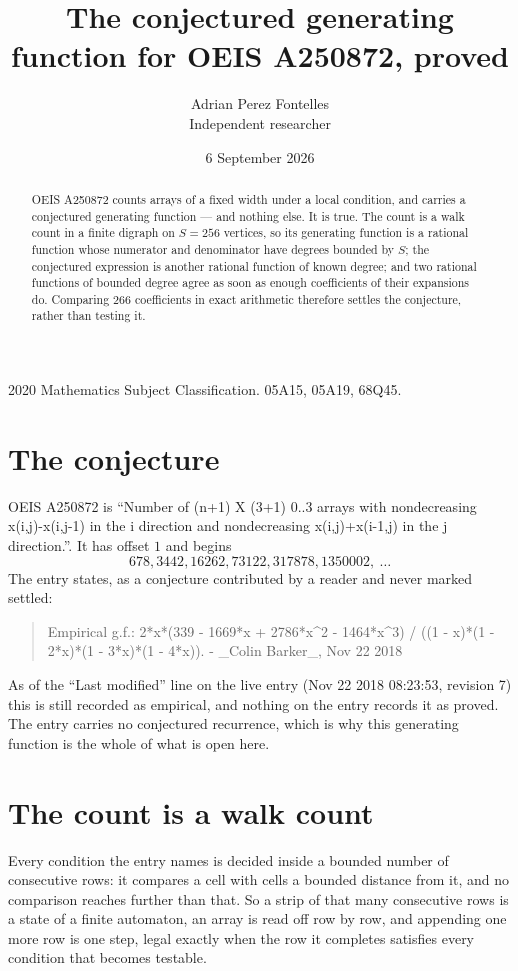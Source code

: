 \documentclass[11pt,a4paper]{article}
\title{The conjectured generating function for OEIS A250872, proved}
\author{Adrian Perez Fontelles\\ \small Independent researcher}
\date{6 September 2026}
\theoremstyle{plain}
\theoremstyle{definition}
\begin{document}
\maketitle

\begin{abstract}
OEIS A250872 counts arrays of a fixed width under a local condition, and carries a conjectured
generating function --- and nothing else. It is true. The count is a walk count in a finite
digraph on $S=256$ vertices, so its generating function is a rational function whose numerator
and denominator have degrees bounded by $S$; the conjectured expression is another rational
function of known degree; and two rational functions of bounded degree agree as soon as enough
coefficients of their expansions do. Comparing $266$ coefficients in exact arithmetic
therefore settles the conjecture, rather than testing it.
\end{abstract}

\noindent\small 2020 Mathematics Subject Classification. 05A15, 05A19, 68Q45.\normalsize

\section{The conjecture}

OEIS A250872 is ``Number of (n+1) X (3+1) 0..3 arrays with nondecreasing x(i,j)-x(i,j-1) in the i direction and nondecreasing x(i,j)+x(i-1,j) in the j direction.''. It has offset $1$ and begins
\[
678, 3442, 16262, 73122, 317878, 1350002,\ \dots
\]
The entry states, as a conjecture contributed by a reader and never marked settled:
\begin{quote}
Empirical g.f.: 2*x*(339 - 1669*x + 2786*x\^{}2 - 1464*x\^{}3) / ((1 - x)*(1 - 2*x)*(1 - 3*x)*(1 - 4*x)). - \_Colin Barker\_, Nov 22 2018
\end{quote}
As of the ``Last modified'' line on the live entry (Nov 22 2018 08:23:53, revision 7) this is still
recorded as empirical, and nothing on the entry records it as proved. The entry carries no
conjectured recurrence, which is why this generating function is the whole of what is open
here.

\section{The count is a walk count}

Every condition the entry names is decided inside a bounded number of consecutive rows: it
compares a cell with cells a bounded distance from it, and no comparison reaches further than
that. So a strip of that many consecutive rows is a state of a finite automaton, an array is
read off row by row, and appending one more row is one step, legal exactly when the row it
completes satisfies every condition that becomes testable.
\end{document}
